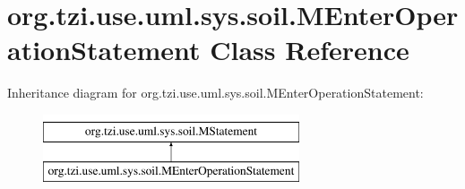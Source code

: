\hypertarget{classorg_1_1tzi_1_1use_1_1uml_1_1sys_1_1soil_1_1_m_enter_operation_statement}{\section{org.\-tzi.\-use.\-uml.\-sys.\-soil.\-M\-Enter\-Operation\-Statement Class Reference}
\label{classorg_1_1tzi_1_1use_1_1uml_1_1sys_1_1soil_1_1_m_enter_operation_statement}
}
Inheritance diagram for org.\-tzi.\-use.\-uml.\-sys.\-soil.\-M\-Enter\-Operation\-Statement\-:\begin{figure}[H]
\begin{center}
\leavevmode
\includegraphics[height=2.000000cm]{classorg_1_1tzi_1_1use_1_1uml_1_1sys_1_1soil_1_1_m_enter_operation_statement}
\end{center}
\end{figure}
